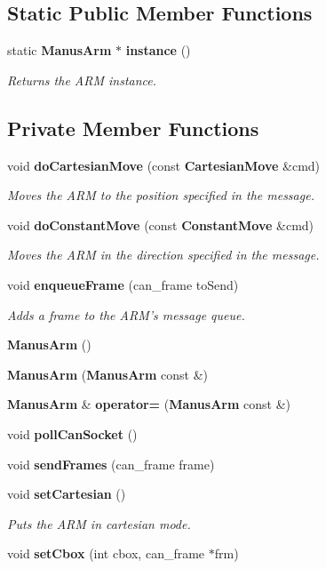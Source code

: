 \subsection*{\-Static \-Public \-Member \-Functions}
\begin{DoxyCompactItemize}
\item 
static {\bf \-Manus\-Arm} $\ast$ {\bf instance} ()
\begin{DoxyCompactList}\small\item\em \-Returns the \-A\-R\-M instance. \end{DoxyCompactList}\end{DoxyCompactItemize}
\subsection*{\-Private \-Member \-Functions}
\begin{DoxyCompactItemize}
\item 
void {\bf do\-Cartesian\-Move} (const {\bf \-Cartesian\-Move} \&cmd)
\begin{DoxyCompactList}\small\item\em \-Moves the \-A\-R\-M to the position specified in the message. \end{DoxyCompactList}\item 
void {\bf do\-Constant\-Move} (const {\bf \-Constant\-Move} \&cmd)
\begin{DoxyCompactList}\small\item\em \-Moves the \-A\-R\-M in the direction specified in the message. \end{DoxyCompactList}\item 
void {\bf enqueue\-Frame} (can\-\_\-frame to\-Send)
\begin{DoxyCompactList}\small\item\em \-Adds a frame to the \-A\-R\-M's message queue. \end{DoxyCompactList}\item 
{\bf \-Manus\-Arm} ()
\item 
{\bf \-Manus\-Arm} ({\bf \-Manus\-Arm} const \&)
\item 
{\bf \-Manus\-Arm} \& {\bf operator=} ({\bf \-Manus\-Arm} const \&)
\item 
void {\bf poll\-Can\-Socket} ()
\item 
void {\bf send\-Frames} (can\-\_\-frame frame)
\item 
void {\bf set\-Cartesian} ()
\begin{DoxyCompactList}\small\item\em \-Puts the \-A\-R\-M in cartesian mode. \end{DoxyCompactList}\item 
void {\bf set\-Cbox} (int cbox, can\-\_\-frame $\ast$frm)
\end{DoxyCompactItemize}
